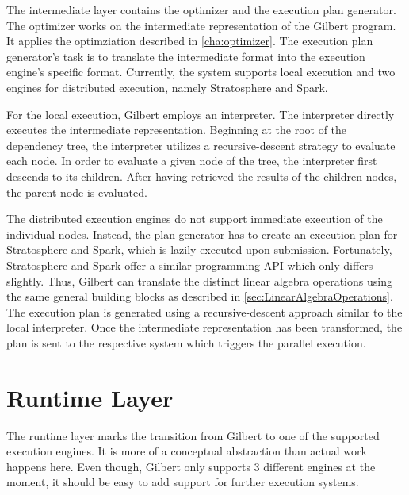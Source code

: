 The intermediate layer contains the optimizer and the execution plan generator.
The optimizer works on the intermediate representation of the Gilbert program.
It applies the optimziation described in \cref{cha:optimizer}.
The execution plan generator's task is to translate the intermediate format into the execution engine's specific format.
Currently, the system supports local execution and two engines for distributed execution, namely Stratosphere and Spark.

For the local execution, Gilbert employs an interpreter.
The interpreter directly executes the intermediate representation.
Beginning at the root of the dependency tree, the interpreter utilizes a recursive-descent strategy to evaluate each node.
In order to evaluate a given node of the tree, the interpreter first descends to its children.
After having retrieved the results of the children nodes, the parent node is evaluated.

The distributed execution engines do not support immediate execution of the individual nodes.
Instead, the plan generator has to create an execution plan for Stratosphere and Spark, which is lazily executed upon submission.
Fortunately, Stratosphere and Spark offer a similar programming API which only differs slightly.
Thus, Gilbert can translate the distinct linear algebra operations using the same general building blocks as described in \cref{sec:LinearAlgebraOperations}.
The execution plan is generated using a recursive-descent approach similar to the local interpreter.
Once the intermediate representation has been transformed, the plan is sent to the respective system which triggers the parallel execution.

\section{Runtime Layer}

The runtime layer marks the transition from Gilbert to one of the supported execution engines.
It is more of a conceptual abstraction than actual work happens here.
Even though, Gilbert only supports 3 different engines at the moment, it should be easy to add support for further execution systems.
